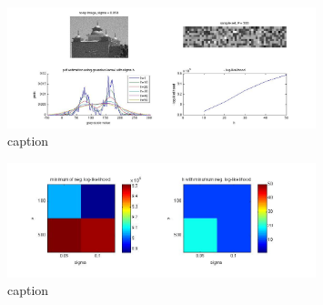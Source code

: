 \documentclass[]{article}
\begin{document}
\begin{figure}[h]
	\centering
		\includegraphics[width=0.8\textwidth]{plot500_005.jpg}
	\caption{caption}
	\label{sg:fig:plot500_005}
\end{figure}

\begin{figure}[h]
	\centering
		\includegraphics[width=0.8\textwidth]{best_log.jpg}
	\caption{caption}
	\label{sg:fig:best_log}
\end{figure}
\end{document}
